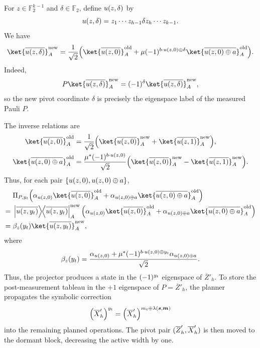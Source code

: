 \documentclass[a4paper,onecolumn,unpublished]{quantumarticle}
\DeclarePairedDelimiter\rbra{\lparen}{\rparen}
\DeclarePairedDelimiter\cbra{\{}{\}}
\newcommand{\ketbra}[3][]{\left\lvert #2 \vphantom{#3} \right>_{#1}\!\!\left< #3 \vphantom{#2} \right\rvert}
\newcommand{\FF}{\mathbb{F}}
\begin{document}
For $z \in \FF_2^{k-1}$ and $\delta \in \FF_2$, define $u\rbra{z, \delta}$ by
\begin{equation*}
    u\rbra{z,\delta} = z_1\cdots z_{h-1}\delta z_{h}\cdots z_{k-1}.
\end{equation*}
We have
\begin{equation*}
    \ket{\overline{u\rbra{z,\delta}}}_A^{\text{new}} = \frac{1}{\sqrt{2}}\rbra*{\ket{\overline{u\rbra{z,0}}}_A^{\text{old}}+\mu \rbra{-1}^{b\cdot u\rbra{z,0} \oplus \delta}\ket{\overline{u\rbra{z,0}\oplus a}}_A^{\text{old}}}.
\end{equation*}
Indeed,
\begin{equation*}
    P \ket{\overline{u\rbra{z,\delta}}}_A^{\text{new}} = \rbra{-1}^{\delta} \ket{\overline{u\rbra{z,\delta}}}_A^{\text{new}},
\end{equation*}
so the new pivot coordinate $\delta$ is precisely the eigenspace label of the measured Pauli $P$.

The inverse relations are
\begin{align*}
    \ket{\overline{u\rbra{z,0}}}_A^{\text{old}} & = \frac{1}{\sqrt{2}}\rbra*{\ket{\overline{u\rbra{z,0}}}_A^{\text{new}} + \ket{\overline{u\rbra{z,1}}}_A^{\text{new}}}, \\
    \ket{\overline{u\rbra{z,0}\oplus a}}_A^{\text{old}} &= \frac{\mu^*\rbra{-1}^{b\cdot u\rbra{z,0}}}{\sqrt{2}}\rbra*{\ket{\overline{u\rbra{z,0}}}_A^{\text{new}} - \ket{\overline{u\rbra{z,1}}}_A^{\text{new}}}.
\end{align*}
Thus, for each pair $\cbra*{u\rbra{z,0}, u\rbra{z,0}\oplus a}$,
\begin{align*}
    & \Pi_{P, y_t} \rbra*{\alpha_{u\rbra{z,0}} \ket{\overline{u\rbra{z,0}}}_A^{\text{old}} + \alpha_{u\rbra{z,0}\oplus a} \ket{\overline{u\rbra{z,0}\oplus a}}_A^{\text{old}}} \\
    ={}& \ketbra{\overline{u\rbra{z,y_t}}}{\overline{u\rbra{z,y_t}}}_A^{\text{new}} \rbra*{\alpha_{u\rbra{z,0}} \ket{\overline{u\rbra{z,0}}}_A^{\text{old}} + \alpha_{u\rbra{z,0}\oplus a} \ket{\overline{u\rbra{z,0}\oplus a}}_A^{\text{old}}}\\
    ={}& \beta_{z}\rbra*{y_t}\ket{\overline{u\rbra{z, y_t}}}_A^{\text{new}},
\end{align*}
where
\begin{equation}
    \beta_{z}\rbra*{y_t} = \frac{\alpha_{u\rbra{z,0}}+\mu^*\rbra{-1}^{b\cdot u\rbra{z,0}\oplus y_t} \alpha_{u\rbra{z,0}\oplus a}}{\sqrt{2}}.
\end{equation}
Thus, the projector produces a state in the $\rbra{-1}^{y_t}$ eigenspace of $\overline{Z}'_h$.
To store the post-measurement tableau in the $+1$ eigenspace of $P = \overline{Z}'_h$, the planner propagates the symbolic correction
\begin{equation*}
    \rbra*{\overline{X}_h'}^{y_t} = \rbra*{\overline{X}_h'}^{m_t\oplus \lambda\rbra{\bm{s},\bm{m}}}
\end{equation*}
into the remaining planned operations.
The pivot pair $\rbra{\overline{Z}_h',\overline{X}_h'}$ is then moved to the dormant block, decreasing the active width by one.
\end{document}
